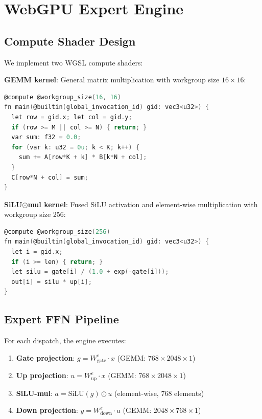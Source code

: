 \documentclass[11pt,a4paper]{article}
\begin{document}
\section{WebGPU Expert Engine}
\label{sec:webgpu}

\subsection{Compute Shader Design}

We implement two WGSL compute shaders:

\textbf{GEMM kernel}: General matrix multiplication with workgroup
size $16 \times 16$:
\begin{lstlisting}[language=C, caption={GEMM compute shader (WGSL)}]
@compute @workgroup_size(16, 16)
fn main(@builtin(global_invocation_id) gid: vec3<u32>) {
  let row = gid.x; let col = gid.y;
  if (row >= M || col >= N) { return; }
  var sum: f32 = 0.0;
  for (var k: u32 = 0u; k < K; k++) {
    sum += A[row*K + k] * B[k*N + col];
  }
  C[row*N + col] = sum;
}
\end{lstlisting}

\textbf{SiLU$\odot$mul kernel}: Fused SiLU activation and
element-wise multiplication with workgroup size 256:
\begin{lstlisting}[language=C, caption={SiLU-mul compute shader (WGSL)}]
@compute @workgroup_size(256)
fn main(@builtin(global_invocation_id) gid: vec3<u32>) {
  let i = gid.x;
  if (i >= len) { return; }
  let silu = gate[i] / (1.0 + exp(-gate[i]));
  out[i] = silu * up[i];
}
\end{lstlisting}

\subsection{Expert FFN Pipeline}

For each dispatch, the engine executes:
\begin{enumerate}
  \item \textbf{Gate projection}: $g = W_{\text{gate}}^e \cdot x$
    (GEMM: $768 \times 2048 \times 1$)
  \item \textbf{Up projection}: $u = W_{\text{up}}^e \cdot x$
    (GEMM: $768 \times 2048 \times 1$)
  \item \textbf{SiLU-mul}: $a = \text{SiLU}(g) \odot u$
    (element-wise, 768 elements)
  \item \textbf{Down projection}: $y = W_{\text{down}}^e \cdot a$
    (GEMM: $2048 \times 768 \times 1$)
\end{enumerate}
\end{document}

